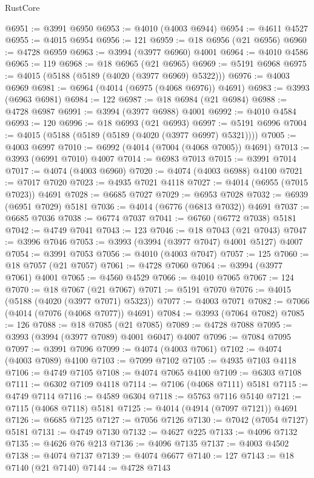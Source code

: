 \begin{lexlean}{RustCore}
\begin{coremodule}
@6951 := @3991 @6950
@6953 := @4010 (@4003 @6944)
@6954 := @4611 @4527
@6955 := @4015 @6954
@6956 := 121
@6959 := @18 @6956 (@21 @6956)
@6960 := @4728 @6959
@6963 := @3994 (@3977 @6960) @4001
@6964 := @4010 @4586
@6965 := 119
@6968 := @18 @6965 (@21 @6965)
@6969 := @5191 @6968
@6975 := @4015 (@5188 (@5189 (@4020 (@3977 @6969) @5322)))
@6976 := @4003 @6969
@6981 := @6964 (@4014 (@6975 (@4068 @6976)) @4691)
@6983 := @3993 (@6963 @6981)
@6984 := 122
@6987 := @18 @6984 (@21 @6984)
@6988 := @4728 @6987
@6991 := @3994 (@3977 @6988) @4001
@6992 := @4010 @4584
@6993 := 120
@6996 := @18 @6993 (@21 @6993)
@6997 := @5191 @6996
@7004 := @4015 (@5188 (@5189 (@5189 (@4020 (@3977 @6997) @5321))))
@7005 := @4003 @6997
@7010 := @6992 (@4014 (@7004 (@4068 @7005)) @4691)
@7013 := @3993 (@6991 @7010) @4007
@7014 := @6983 @7013
@7015 := @3991 @7014
@7017 := @4074 (@4003 @6960)
@7020 := @4074 (@4003 @6988) @4100
@7021 := @7017 @7020
@7023 := @4935 @7021 @4118
@7027 := @4014 (@6955 (@7015 @7023)) @4691
@7028 := @6685 @7027
@7029 := @6953 @7028
@7032 := @6939 (@6951 @7029) @5181
@7036 := @4014 (@6776 (@6813 @7032)) @4691
@7037 := @6685 @7036
@7038 := @6774 @7037
@7041 := @6760 (@6772 @7038) @5181
@7042 := @4749 @7041
@7043 := 123
@7046 := @18 @7043 (@21 @7043)
@7047 := @3996 @7046
@7053 := @3993 (@3994 (@3977 @7047) @4001 @5127) @4007
@7054 := @3991 @7053
@7056 := @4010 (@4003 @7047)
@7057 := 125
@7060 := @18 @7057 (@21 @7057)
@7061 := @4728 @7060
@7064 := @3994 (@3977 @7061) @4001
@7065 := @4560 @4529
@7066 := @4010 @7065
@7067 := 124
@7070 := @18 @7067 (@21 @7067)
@7071 := @5191 @7070
@7076 := @4015 (@5188 (@4020 (@3977 @7071) @5323))
@7077 := @4003 @7071
@7082 := @7066 (@4014 (@7076 (@4068 @7077)) @4691)
@7084 := @3993 (@7064 @7082)
@7085 := 126
@7088 := @18 @7085 (@21 @7085)
@7089 := @4728 @7088
@7095 := @3993 (@3994 (@3977 @7089) @4001 @6047) @4007
@7096 := @7084 @7095
@7097 := @3991 @7096
@7099 := @4074 (@4003 @7061)
@7102 := @4074 (@4003 @7089) @4100
@7103 := @7099 @7102
@7105 := @4935 @7103 @4118
@7106 := @4749 @7105
@7108 := @4074 @7065 @4100
@7109 := @6303 @7108
@7111 := @6302 @7109 @4118
@7114 := @7106 (@4068 @7111) @5181
@7115 := @4749 @7114
@7116 := @4589 @6304
@7118 := @5763 @7116 @5140
@7121 := @7115 (@4068 @7118) @5181
@7125 := @4014 (@4914 (@7097 @7121)) @4691
@7126 := @6685 @7125
@7127 := @7056 @7126
@7130 := @7042 (@7054 @7127) @5181
@7131 := @4749 @7130
@7132 := @4627 @225
@7133 := @4096 @7132
@7135 := @4626 @76 @213
@7136 := @4096 @7135
@7137 := @4003 @4502
@7138 := @4074 @7137
@7139 := @4074 @6677
@7140 := 127
@7143 := @18 @7140 (@21 @7140)
@7144 := @4728 @7143

\end{coremodule}
\end{lexlean}
